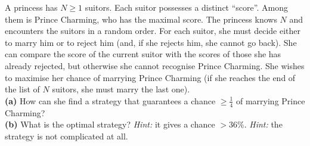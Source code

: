 \begin{problem}
    A princess has \( N \geq 1 \) suitors. Each suitor possesses a distinct ``score''. Among them is Prince Charming, who has the maximal score. The princess knows \( N \) and encounters the suitors in a random order. For each suitor, she must decide either to marry him or to reject him (and, if she rejects him, she cannot go back). She can compare the score of the current suitor with the scores of those she has already rejected, but otherwise she cannot recognise Prince Charming. She wishes to maximise her chance of marrying Prince Charming (if she reaches the end of the list of \( N \) suitors, she must marry the last one).\\[0.5em] \textbf{(a)} How can she find a strategy that guarantees a chance \( \geq \frac{1}{4} \) of marrying Prince Charming?\\
    \textbf{(b)} What is the optimal strategy? \emph{Hint:} it gives a chance \( >36\% \). \emph{Hint:} the strategy is not complicated at all.\\
\end{problem}
